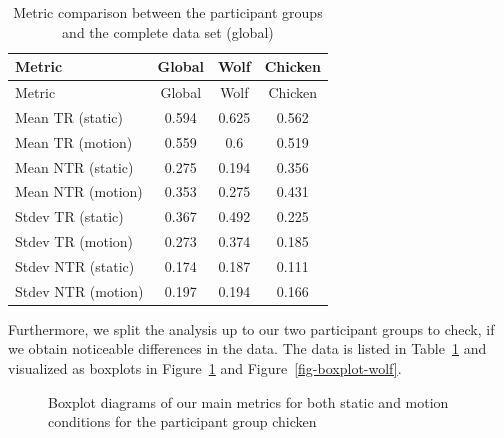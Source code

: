 \documentclass[
  12pt,
  letterpaper,
  DIV=11,
  numbers=noendperiod]{scrreprt}
\begin{document}
\begin{longtable}[]{@{}lccc@{}}
\caption{Metric comparison between the participant groups and the
complete data set
(global)}\label{tbl-condition-group-comparison}\tabularnewline
\toprule\noalign{}
Metric & Global & Wolf & Chicken \\
\midrule\noalign{}
\endfirsthead
\toprule\noalign{}
Metric & Global & Wolf & Chicken \\
\midrule\noalign{}
\endhead
\bottomrule\noalign{}
\endlastfoot
Mean TR (static) & 0.594 & 0.625 & 0.562 \\
Mean TR (motion) & 0.559 & 0.6 & 0.519 \\
Mean NTR (static) & 0.275 & 0.194 & 0.356 \\
Mean NTR (motion) & 0.353 & 0.275 & 0.431 \\
Stdev TR (static) & 0.367 & 0.492 & 0.225 \\
Stdev TR (motion) & 0.273 & 0.374 & 0.185 \\
Stdev NTR (static) & 0.174 & 0.187 & 0.111 \\
Stdev NTR (motion) & 0.197 & 0.194 & 0.166 \\
\end{longtable}

Furthermore, we split the analysis up to our two participant groups to
check, if we obtain noticeable differences in the data. The data is
listed in Table~\ref{tbl-condition-group-comparison} and visualized as
boxplots in Figure~\ref{fig-boxplot-chicken} and
Figure~\ref{fig-boxplot-wolf}.

\begin{figure}


\caption{\label{fig-boxplot-chicken}Boxplot diagrams of our main metrics
for both static and motion conditions for the participant group chicken}

\end{figure}%
\end{document}
